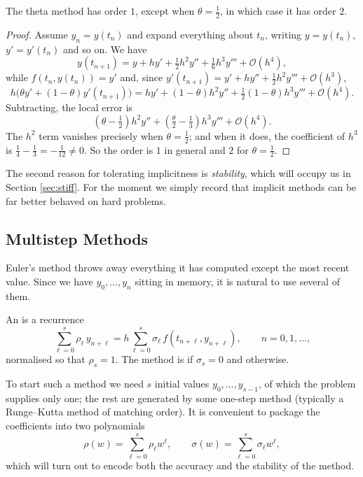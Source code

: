 \begin{proposition}
  The theta method has order $1$, except when $\theta = \tfrac12$, in which case it has order $2$.
\end{proposition}
\begin{proof}
  Assume $y_n = y(t_n)$ and expand everything about $t_n$, writing $y = y(t_n)$, $y' = y'(t_n)$ and so on. We have
  $$
  y(t_{n+1}) = y + hy' + \tfrac{1}{2}h^2 y'' + \tfrac16 h^3 y''' + \mathcal{O}(h^4),
  $$
  while $f(t_n, y(t_n)) = y'$ and, since $y'(t_{n+1}) = y' + hy'' + \tfrac12 h^2 y''' + \mathcal{O}(h^3)$,
  $$
  h\Big(\theta y' + (1-\theta)y'(t_{n+1})\Big) = hy' + (1-\theta)h^2 y'' + \tfrac12(1-\theta)h^3 y''' + \mathcal{O}(h^4).
  $$
  Subtracting, the local error is
  $$
  \left(\theta - \tfrac12\right)h^2 y'' + \left(\tfrac{\theta}{2} - \tfrac13\right)h^3y''' + \mathcal{O}(h^4).
  $$
  The $h^2$ term vanishes precisely when $\theta = \tfrac12$; and when it does, the coefficient of $h^3$ is $\tfrac14 - \tfrac13 = -\tfrac1{12} \neq 0$. So the order is $1$ in general and $2$ for $\theta = \tfrac12$.
\end{proof}

The second reason for tolerating implicitness is \emph{stability}, which will occupy us in Section \ref{sec:stiff}. For the moment we simply record that implicit methods can be far better behaved on hard problems.

\subsection{Multistep Methods}

Euler's method throws away everything it has computed except the most recent value. Since we have $y_0, \dots, y_{n}$ sitting in memory, it is natural to use several of them.

\begin{definition}
  An  is a recurrence
  $$
  \sum_{\ell=0}^{s}\rho_\ell\, y_{n+\ell} = h\sum_{\ell=0}^{s}\sigma_\ell\, f(t_{n+\ell}, y_{n+\ell}), \qquad n = 0, 1, \dots,
  $$
  normalised so that $\rho_s = 1$. The method is  if $\sigma_s = 0$ and  otherwise.
\end{definition}

To start such a method we need $s$ initial values $y_0, \dots, y_{s-1}$, of which the problem supplies only one; the rest are generated by some one-step method (typically a Runge--Kutta method of matching order). It is convenient to package the coefficients into two polynomials
$$
\rho(w) = \sum_{\ell=0}^{s}\rho_\ell w^\ell, \qquad \sigma(w) = \sum_{\ell=0}^s \sigma_\ell w^\ell,
$$
which will turn out to encode both the accuracy and the stability of the method.

